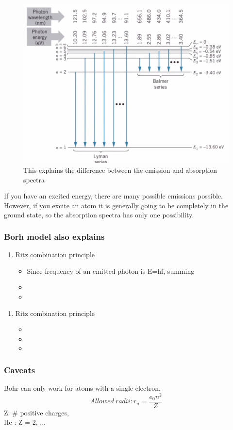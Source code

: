 \documentclass[class=article,crop=false]{standalone}
\begin{document}
\begin{figure}[h]
	\centering
	\includegraphics[width=.7\linewidth]{./Images/hydrogen_atom.png}
	\caption{This explains the difference between the emission and absorption spectra}
\end{figure}

If you have an excited energy, there are many possible emissions possible. However, if you excite an atom it is generally going to be completely in the ground state, so the absorption spectra has only one possibility.

\subsubsection{Borh model also explains}
\begin{enumerate}
\item Ritz combination principle\\
	\begin{itemize}
		\item Since frequency of an emitted photon is E=hf, summing
		\item
		\item
	\end{itemize}
\end{enumerate}

\begin{enumerate}
\item Ritz combination principle\\
	\begin{itemize}
		\item
		\item
		\item
	\end{itemize}
\end{enumerate}

\newpage
\subsubsection{Caveats}
Bohr can only work for atoms with a single electron. 
\[ Allowed\ radii: r_n = \frac{e_0n^2}{Z} \]
Z: \# positive charges,\\
He : Z = 2, ... \\
\\
\end{document}

